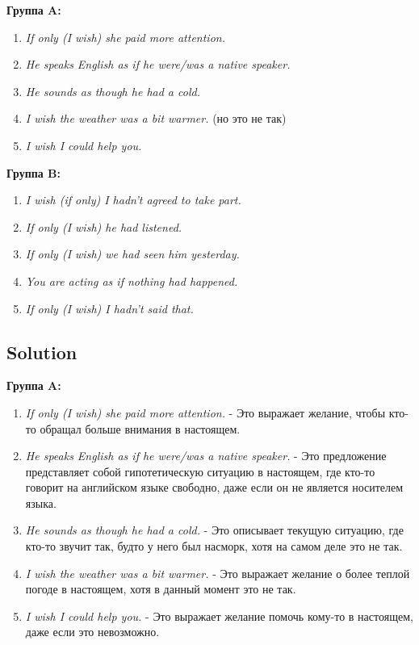 \textbf{Группа A:}
\begin{enumerate}
      \item \textit{If only (I wish) she paid more attention.}
      \item \textit{He speaks English as if he were/was a native speaker.}
      \item \textit{He sounds as though he had a cold.}
      \item \textit{I wish the weather was a bit warmer.} (но это не так)
      \item \textit{I wish I could help you.}
\end{enumerate}

\textbf{Группа B:}
\begin{enumerate}
      \item \textit{I wish (if only) I hadn't agreed to take part.}
      \item \textit{If only (I wish) he had listened.}
      \item \textit{If only (I wish) we had seen him yesterday.}
      \item \textit{You are acting as if nothing had happened.}
      \item \textit{If only (I wish) I hadn’t said that.}
\end{enumerate}

\subsection*{Solution}
\textbf{Группа A:}
\begin{enumerate}
      \item \textit{If only (I wish) she paid more attention.} - Это выражает желание, чтобы кто-то обращал больше внимания в настоящем.
      \item \textit{He speaks English as if he were/was a native speaker.} - Это предложение представляет собой гипотетическую ситуацию в настоящем, где кто-то говорит на английском языке свободно, даже если он не является носителем языка.
      \item \textit{He sounds as though he had a cold.} - Это описывает текущую ситуацию, где кто-то звучит так, будто у него был насморк, хотя на самом деле это не так.
      \item \textit{I wish the weather was a bit warmer.} - Это выражает желание о более теплой погоде в настоящем, хотя в данный момент это не так.
      \item \textit{I wish I could help you.} - Это выражает желание помочь кому-то в настоящем, даже если это невозможно.
\end{enumerate}

